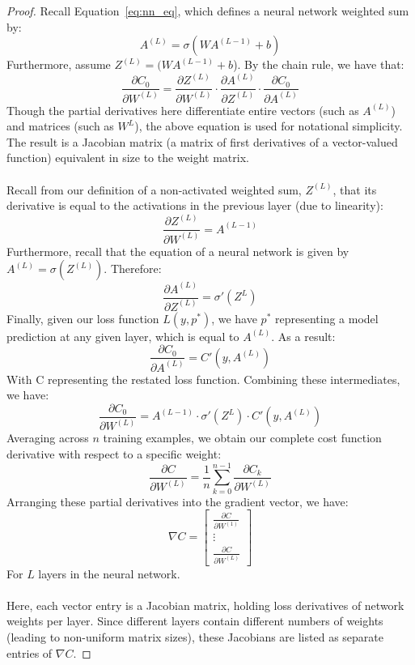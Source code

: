 \documentclass{article}
\theoremstyle{definition}
\begin{document}
\begin{proof}
Recall Equation~\eqref{eq:nn_eq}, which defines a neural network weighted sum by:
\[
A^{(L)} = \sigma(WA^{(L-1)} + b)
\]
Furthermore, assume $Z^{(L)} = (WA^{(L-1)} + b$).
By the chain rule, we have that:
\[
\frac{\partial C_0}{\partial W^{(L)}} = \frac{\partial Z^{(L)}}{\partial W^{(L)}} \cdot \frac{\partial A^{(L)}}{\partial Z^{(L)}} \cdot \frac{\partial C_0}{\partial A^{(L)}}
\]
Though the partial derivatives here differentiate entire vectors (such as $A^{(L)}$) and matrices (such as $W^{L}$), the above equation is used for notational simplicity. The result is a Jacobian matrix (a matrix of first derivatives of a vector-valued function) equivalent in size to the weight matrix. \\ \\
Recall from our definition of a non-activated weighted sum, $Z^{(L)}$, that its derivative is equal to the activations in the previous layer (due to linearity):
\[
\frac{\partial Z^{(L)}}{\partial W^{(L)}} = A^{(L-1)}
\]
Furthermore, recall that the equation of a neural network is given by $A^{(L)} = \sigma (Z^{(L)})$. Therefore:
\[
\frac{\partial A^{(L)}}{\partial Z^{(L)}} = \sigma'(Z^{L})
\]
Finally, given our loss function $L(y, p^*)$, we have $p^*$ representing a model prediction at any given layer, which is equal to $A^{(L)}$. As a result:
\[
\frac{\partial C_0}{\partial A^{(L)}} = C'(y, A^{(L)})
\]
With C representing the restated loss function. Combining these intermediates, we have:
\[
\frac{\partial C_0}{\partial W^{(L)}} = A^{(L-1)} \cdot \sigma'(Z^{L}) \cdot C'(y, A^{(L)})
\]
Averaging across $n$ training examples, we obtain our complete cost function derivative with respect to a specific weight:
\[
\frac{\partial C}{\partial W^{(L)}} = \frac{1}{n} \sum_{k = 0}^{n-1} \frac{\partial C_k}{\partial W^{(L)}}
\]
Arranging these partial derivatives into the gradient vector, we have:
\[
\nabla C =
\begin{bmatrix}
\frac{\partial C}{\partial W^{(1)}} \\
\vdots \\
\frac{\partial C}{\partial W^{(L)}}
\end{bmatrix}
\]
For $L$ layers in the neural network. \\ \\
Here, each vector entry is a Jacobian matrix, holding loss derivatives of network weights per layer. Since different layers contain different numbers of weights (leading to non-uniform matrix sizes), these Jacobians are listed as separate entries of $\nabla C$. 
\end{proof}
\end{document}
